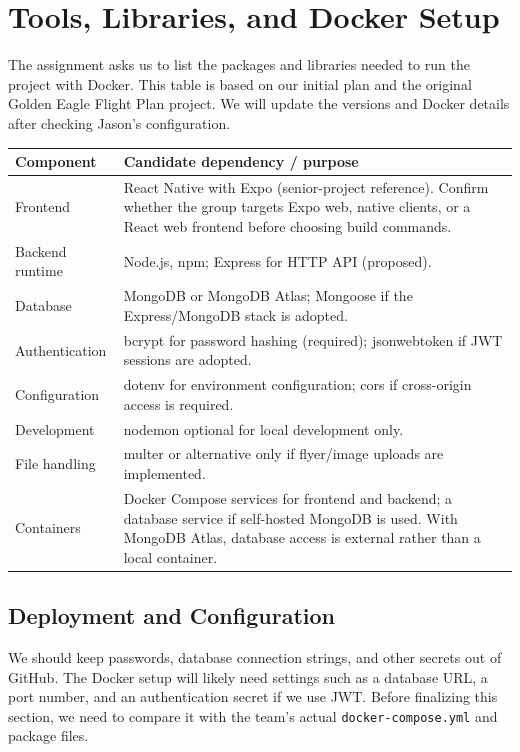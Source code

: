 \documentclass[11pt,letterpaper]{article}
\begin{document}
\section{Tools, Libraries, and Docker Setup}
The assignment asks us to list the packages and libraries needed to run the project with Docker. This table is based on our initial plan and the original Golden Eagle Flight Plan project. We will update the versions and Docker details after checking Jason's configuration.
\begin{longtable}{p{}p{}}
\toprule Component & Candidate dependency / purpose \\ \midrule
Frontend & React Native with Expo (senior-project reference). Confirm whether the group targets Expo web, native clients, or a React web frontend before choosing build commands.\\
Backend runtime & Node.js, npm; Express for HTTP API (proposed).\\
Database & MongoDB or MongoDB Atlas; Mongoose if the Express/MongoDB stack is adopted.\\
Authentication & bcrypt for password hashing (required); jsonwebtoken if JWT sessions are adopted.\\
Configuration & dotenv for environment configuration; cors if cross-origin access is required.\\
Development & nodemon optional for local development only.\\
File handling & multer or alternative only if flyer/image uploads are implemented.\\
Containers & Docker Compose services for frontend and backend; a database service if self-hosted MongoDB is used. With MongoDB Atlas, database access is external rather than a local container.\\
\bottomrule
\end{longtable}
\subsection{Deployment and Configuration}
We should keep passwords, database connection strings, and other secrets out of GitHub. The Docker setup will likely need settings such as a database URL, a port number, and an authentication secret if we use JWT. Before finalizing this section, we need to compare it with the team's actual \texttt{docker-compose.yml} and package files.
\end{document}
